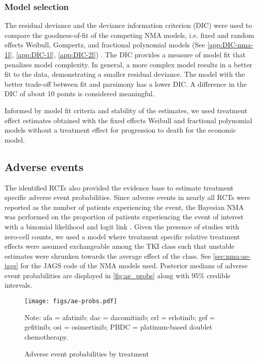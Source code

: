 \documentclass[11pt,final,fleqn]{article}\usepackage[]{graphicx}\usepackage[]{color}
\theoremstyle{plain}
\begin{document}
{\subsubsection{Model selection}\label{subsubsec:DIC}
The residual deviance and the deviance information criterion (DIC) were used to compare the goodness-of-fit of the competing NMA models, i.e. fixed and random effects Weibull, Gompertz, and fractional polynomial models (See \autoref{app:DIC-nma-1l}, \autoref{app:DIC-1l}, \autoref{app:DIC-2l}) \citep{dias2018network}. The DIC provides a measure of model fit that penalizes model complexity. In general, a more complex model results in a better fit to the data, demonstrating a smaller residual deviance. The model with the better trade-off between fit and parsimony has a lower DIC. A difference in the DIC of about 10 points is considered meaningful. 

Informed by model fit criteria and stability of the estimates, we used treatment effect estimates obtained with the fixed effects Weibull and fractional polynomial models without a treatment effect for progression to death for the economic model. 


\subsection{Adverse events}\label{subsec:data-aes}
The identified RCTs also provided the evidence base to estimate treatment specific adverse event probabilities. Since adverse events in nearly all RCTs were reported as the number of patients experiencing the event, the Bayesian NMA was performed on the proportion of patients experiencing the event of interest with a binomial likelihood and logit link \citep[Chapter~2]{dias2018network}. Given the presence of studies with zero-cell counts, we used a model where treatment specific relative treatment effects were assumed exchangeable among the TKI class such that unstable estimates were shrunken towards the average effect of the class. See \autoref{sec:nma-ae-jags} for the JAGS code of the NMA models used. Posterior medians of adverse event probabilities are displayed in \autoref{fig:ae_probs} along with 95\% credible intervals.

\begin{figure}[h]
\centering
\texttt{[image: figs/ae-probs.pdf]} 
\caption{Adverse event probabilities by treatment}\label{fig:ae_probs}
\begin{minipage}{\linewidth}
\footnotesize
Note: afa = afatinib; dac = dacomitinib; erl = erlotinib; gef = gefitinib; osi = osimertinib; PBDC = platinum-based doublet chemotherapy.
\end{minipage}
\end{figure}

}
\end{document}
